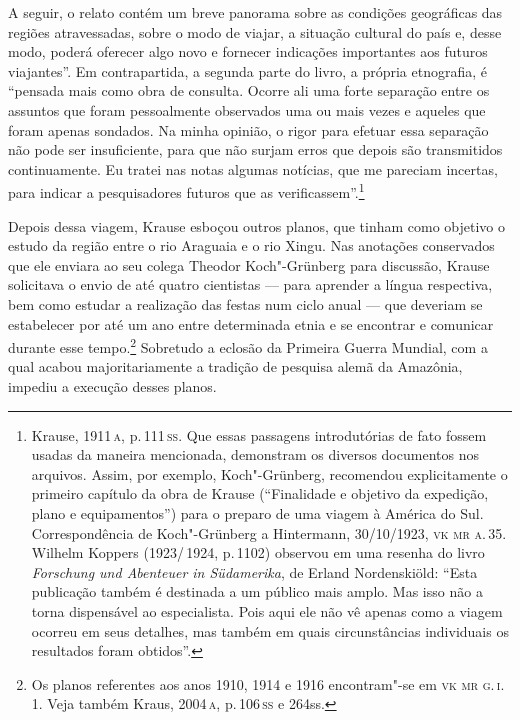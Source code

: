 A seguir, o relato
contém um breve panorama sobre as condições geográficas das regiões
atravessadas, sobre o modo de viajar, a situação cultural do país e,
desse modo, poderá oferecer algo novo e fornecer indicações importantes
aos futuros viajantes''. Em contrapartida, a segunda parte do livro, a
própria etnografia, é ``pensada mais como obra de consulta. Ocorre ali
uma forte separação entre os assuntos que foram pessoalmente observados
uma ou mais vezes e aqueles que foram apenas sondados. Na minha opinião,
o rigor para efetuar essa separação não pode ser insuficiente, para que
não surjam erros que depois são transmitidos continuamente. Eu tratei
nas notas algumas notícias, que me pareciam incertas, para indicar a
pesquisadores futuros que as verificassem''.\footnote{Krause, 1911\,\textsc{a}, p.\,111\,\textsc{ss}. Que essas passagens introdutórias de fato fossem
  usadas da maneira mencionada, demonstram os diversos documentos nos
  arquivos. Assim, por exemplo, Koch"-Grünberg, recomendou
  explicitamente o primeiro capítulo da obra de Krause (``Finalidade e objetivo da
  expedição, plano e equipamentos'') para o preparo de uma viagem à
  América do Sul. Correspondência de Koch"-Grünberg a Hintermann,
  30/10/1923, \textsc{vk mr a.\,35}. Wilhelm Koppers (1923/\,1924, p.\,1102) observou em
  uma resenha do livro \emph{Forschung und Abenteuer in Südamerika}, de Erland Nordenskiöld:
  ``Esta publicação também é destinada a um público mais amplo. Mas isso
  não a torna dispensável ao especialista. Pois aqui ele não vê apenas
  como a viagem ocorreu em seus detalhes, mas também em quais
  circunstâncias individuais os resultados foram obtidos''.}

Depois dessa viagem, Krause esboçou outros planos, que tinham como
objetivo o estudo da região entre o rio Araguaia e o rio Xingu. Nas
anotações conservados que ele enviara ao seu colega Theodor
Koch"-Grünberg para discussão, Krause solicitava o envio de até quatro
cientistas --- para aprender a língua respectiva, bem como estudar a
realização das festas num ciclo anual --- que deveriam se estabelecer por
até um ano entre determinada etnia e se encontrar e comunicar durante
esse tempo.\footnote{Os planos referentes aos anos 1910, 1914 e 1916
  encontram"-se em \textsc{vk mr g.\,i.\,1}. Veja também Kraus, 2004\,\textsc{a}, p.\,106\,\textsc{ss} e
  264ss.} Sobretudo a eclosão da Primeira Guerra Mundial, com a qual
acabou majoritariamente a tradição de pesquisa alemã da Amazônia,
impediu a execução desses planos.

